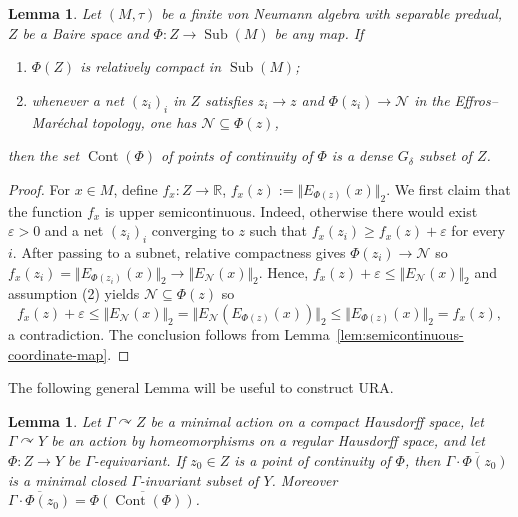 \documentclass[12pt]{amsart} %
\theoremstyle{plain}
\newtheorem{lemma}[theorem]{Lemma}
\theoremstyle{definition}
\DeclareMathOperator{\Sub}{Sub}
\begin{document}
\begin{lemma}
\label{lem:Baire-compact-range}
Let $(M,\tau)$ be a finite von Neumann algebra with separable
predual, $Z$ be a Baire space and $\Phi:Z\to\Sub(M)$ be any map.  If
\begin{enumerate}
\item $\Phi(Z)$ is relatively compact in $\Sub(M)$;
\item whenever a net $(z_i)_i$ in $Z$ satisfies $z_i\to z$ and
$\Phi(z_i)\to\mathcal N$ in the Effros--Mar\'echal topology, one has
$\mathcal N\subseteq\Phi(z)$,
\end{enumerate}
then the set $\operatorname{Cont}(\Phi)$ of points of continuity of $\Phi$ is a dense $G_\delta$
subset of $Z$. \end{lemma}
\begin{proof}
For $x\in M$, define $f_x:Z\to\mathbb R$, $f_x(z):=\Vert E_{\Phi(z)}(x)\Vert_2$.  We first claim that the function $f_x$ is upper
semicontinuous.  Indeed, otherwise there would exist $\varepsilon>0$ and a net $(z_i)_i$ converging to $z$ such that $f_x(z_i)\geq f_x(z)+\varepsilon$ for every $i$.  After passing
to a subnet, relative compactness gives
$\Phi(z_i)\to\mathcal N$ so $f_x(z_i)=\Vert E_{\Phi(z_i)}(x)\Vert_2\to\Vert E_{\mathcal{N}}(x)\Vert_2$.  Hence, $f_x(z)+\varepsilon
\leq\Vert E_{\mathcal{N}}(x)\Vert_2$ and assumption {\rm(2)} yields
$\mathcal N\subseteq\Phi(z)$ so
$$
f_x(z)+\varepsilon
\leq \Vert E_{\mathcal{N}}(x)\Vert_2=\Vert E_{\mathcal{N}}(E_{\Phi(z)}(x))\Vert_2
\leq \Vert E_{\Phi(z)}(x)\Vert_2
=f_x(z),
$$
a contradiction.
The conclusion follows from
Lemma~\ref{lem:semicontinuous-coordinate-map}.
\end{proof}
\noindent The following general Lemma will be useful to construct URA.
\begin{lemma}\label{lem:Minimality from a continuity point}
Let $\Gamma\curvearrowright Z$ be a minimal action on a compact Hausdorff
space, let $\Gamma\curvearrowright Y$ be an action by homeomorphisms on a
regular Hausdorff space, and let $\Phi:Z\to Y$ be $\Gamma$-equivariant.  If
$z_0\in Z$ is a point of continuity of $\Phi$, then $\overline{\Gamma\cdot\Phi(z_0)}$ is a minimal closed $\Gamma$-invariant subset of $Y$. Moreover $\overline{\Gamma\cdot\Phi(z_0)}=\overline{\Phi(\operatorname{Cont}(\Phi))}$.
\end{lemma}
\end{document}
